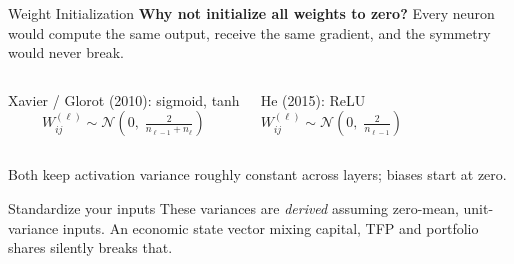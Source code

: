 \documentclass[aspectratio=169,11pt]{beamer}
\begin{document}
\begin{frame}{Weight Initialization}
\textbf{Why not initialize all weights to zero?} Every neuron would compute the same output, receive the same gradient, and the symmetry would never break.

\vspace{0.4cm}
\begin{columns}[T]
\begin{block}{Xavier / Glorot (2010): sigmoid, tanh}
\[
    W_{ij}^{(\ell)} \sim \mathcal{N}\!\left(0,\; \tfrac{2}{n_{\ell-1} + n_{\ell}}\right)
\]
\end{block}

\begin{block}{He (2015): ReLU}
\[
    W_{ij}^{(\ell)} \sim \mathcal{N}\!\left(0,\; \tfrac{2}{n_{\ell-1}}\right)
\]
\end{block}
\end{columns}

\vspace{0.25cm}
{\small Both keep activation variance roughly constant across layers; biases start at zero.}

\vspace{0.25cm}
\begin{alertblock}{Standardize your inputs}
\small These variances are \emph{derived} assuming zero-mean, unit-variance inputs.  An economic state vector mixing capital, TFP and portfolio shares silently breaks that.
\end{alertblock}
\end{frame}
\end{document}
